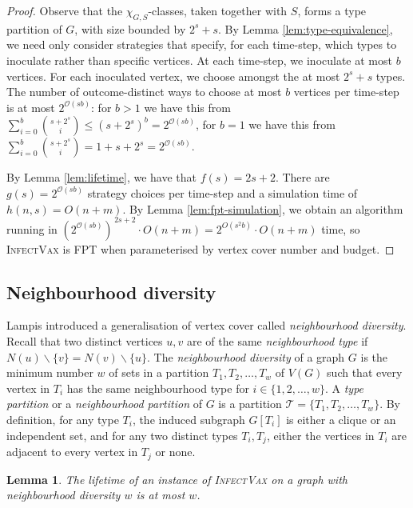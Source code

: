 \documentclass[unknownkeysallowed]{article}
\newtheorem{lemma}[theorem]{Lemma}
\theoremstyle{definition}\newtheorem{strategy}{Strategy}
\theoremstyle{definition}\newtheorem{notation}{Notation}[theorem]
\newcommand*{\IV}{\textup{\textsc{InfectVax}}\xspace}
\begin{document}
\begin{proof}
  Observe that the $\chi_{G,S}$-classes, taken together with $S$, forms a type partition of $G$, with size bounded by $2^s+ s$.  By Lemma \ref{lem:type-equivalence}, we need only consider strategies that specify, for each time-step, which types to inoculate rather than specific vertices. At each time-step, we inoculate at most $b$ vertices. For each inoculated vertex, we choose amongst the at most $2^s + s$ types.  The number of outcome-distinct ways to choose at most $b$ vertices per time-step is at most $2^{\mathcal{O}(sb)}$: for $b>1$ we have this from $\sum_{i=0}^b \binom{s+2^s}{i} \le (s + 2^s)^b = 2^{\mathcal{O}(sb)}$, for $b=1$ we have this from $\sum_{i=0}^b \binom{s+2^s}{i} = 1+s+2^s = 2^{\mathcal{O}(sb)}$.  

   By Lemma \ref{lem:lifetime}, we have that $f(s) = 2s+2$. There are $g(s) =2^{\mathcal{O}(sb)}$ strategy choices per time-step and a simulation time of $h(n,s) = O(n+m)$. By Lemma \ref{lem:fpt-simulation}, we obtain an algorithm running in $( 2^{\mathcal{O}(sb)} )^{\,2s+2} \cdot O(n+m) = 2^{O(s^2b)} \cdot O(n+m)$ time, so \IV is FPT when parameterised by vertex cover number and budget.
\end{proof}

\subsection{Neighbourhood diversity}
\label{sec:neighbourhood-diversity}


Lampis \cite{lampis_2012} introduced a generalisation of vertex cover called {\it neighbourhood diversity}.  Recall that two distinct vertices $u,v$ are of the same {\it neighbourhood type} if $N(u) \backslash \{v\} = N(v) \backslash \{u\}$.  The {\it neighbourhood diversity} of a graph $G$ is the minimum number $w$ of sets in a partition $T_1,T_2,\dots, T_w$ of $V(G)$ such that every vertex in $T_i$ has the same neighbourhood type for $i \in \{1,2,\dots,w\}$.  A {\it type partition} or a {\it neighbourhood partition} of $G$ is a partition $\mathcal{T} = \{T_1,T_2,\dots,T_w\}$.  By definition, for any type $T_i$, the induced subgraph $G[T_i]$ is either a clique or an independent set, and for any two distinct types $T_i,T_j$, either the vertices in $T_i$ are adjacent to every vertex in $T_j$ or none.     

\begin{lemma}\label{lem:neigh-div-lifetime-bound}
    The lifetime of an instance of \IV on a graph with neighbourhood diversity $w$ is at most $w$.
\end{lemma}
\end{document}
